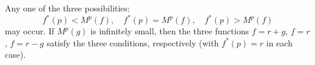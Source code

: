 Any one of the three possibilities:
$$f^*(p) < M^p(f), \quad f^*(p) = M^p(f), \quad f^*(p) > M^p(f)$$
may occur. If $M^p(g)$ is infinitely small, then the three functions $f = r + g$, $f = r$, $f = r - g$ satisfy the three conditions, respectively (with $f^*(p) = r$ in each case).
